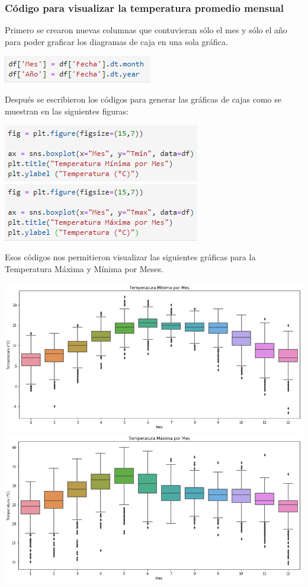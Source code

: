\documentclass{article}
\begin{document}
\subsubsection{Código para visualizar la temperatura promedio mensual}
\noindent Primero se crearon nuevas columnas que contuvieran sólo el mes y sólo el año para poder graficar los diagramas de caja en una sola gráfica.
\begin{center}
    \includegraphics[scale = 0.9]{MY.png}
\end{center}
Después se escribieron los códigos para generar las gráficas de cajas como se muestran en las siguientes figuras:
\begin{center}
    \includegraphics[scale = 0.9]{CTminBoxM.png}
    \includegraphics[scale = 0.9]{CTmaxBoxM.png}
\end{center}
\clearpage
Esos códigos nos permitieron visualizar las siguientes gráficas para la Temperatura Máxima y Mínima por Meses.
\begin{center}
    \includegraphics[scale = 0.45]{TminBoxM.png}
    \includegraphics[scale = 0.45]{TmaxBoxM.png}
\end{center}
\end{document}
